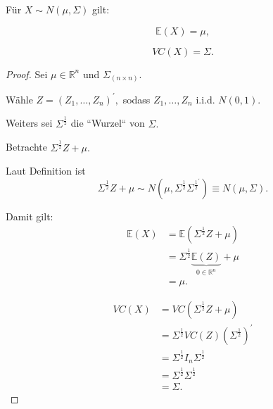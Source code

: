 \documentclass{tstextbook}
\begin{document}
\begin{theorem}[]
  \label{th:}
  \index{}
 Für $ X\sim N\left(\mu,\Sigma\right) $ gilt:
 
 \[
 \mathbb{E}(X)=\mu,
 \]
 
 \[
 VC(X)=\Sigma.
 \]
\end{theorem}
\begin{proof}
Sei $\mu\in\mathbb{R}^{n}$ und $\Sigma_{(n\times n)}.$

Wähle $Z=\left(Z_{1},\ldots,Z_{n}\right)^{\prime},$ sodass $Z_{1},\ldots,Z_{n}$
i.i.d. $N(0,1).$

Weiters sei $\Sigma^{\frac{1}{2}}$ die ``Wurzel`` von $\Sigma.$

Betrachte $\Sigma^{\frac{1}{2}}Z+\mu.$ 

Laut Definition ist 
\[
\Sigma^{\frac{1}{2}}Z+\mu\sim N\left(\mu,\Sigma^{\frac{1}{2}}\Sigma^{\frac{1}{2}^{\prime}}\right)\equiv N\left(\mu,\Sigma\right).
\]

Damit gilt:
\begin{align*}
	\mathbb{E}(X) & =\mathbb{E}\left(\Sigma^{\frac{1}{2}}Z+\mu\right)\\
	& =\Sigma^{\frac{1}{2}}\underset{0\in\mathbb{R}^{n}}{\underbrace{\mathbb{E}(Z)}}+\mu\\
	& =\mu.
\end{align*}

\begin{align*}
	VC(X) & =VC\left(\Sigma^{\frac{1}{2}}Z+\mu\right)\\
	& =\Sigma^{\frac{1}{2}}VC(Z)\left(\Sigma^{\frac{1}{2}}\right)^{\prime}\\
	& =\Sigma^{\frac{1}{2}}I_{n}\Sigma^{\frac{1}{2}}\\
	& =\Sigma^{\frac{1}{2}}\Sigma^{\frac{1}{2}}\\
	& =\Sigma.
\end{align*}

\end{proof}
\end{document}
